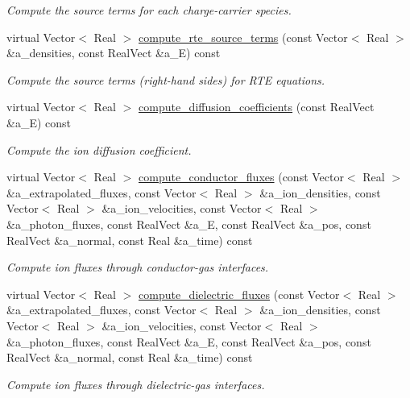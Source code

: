 \begin{DoxyCompactItemize}
\begin{DoxyCompactList}\small\item\em Compute the source terms for each charge-\/carrier species. \end{DoxyCompactList}\item 
virtual Vector$<$ Real $>$ \hyperlink{classmorrow__lowke_a6748c878d9069ec28cb1e22f4e75d7a0}{compute\+\_\+rte\+\_\+source\+\_\+terms} (const Vector$<$ Real $>$ \&a\+\_\+densities, const Real\+Vect \&a\+\_\+E) const 
\begin{DoxyCompactList}\small\item\em Compute the source terms (right-\/hand sides) for R\+TE equations. \end{DoxyCompactList}\item 
virtual Vector$<$ Real $>$ \hyperlink{classmorrow__lowke_a4c1779b91b8a7178c0fed5461e5caffa}{compute\+\_\+diffusion\+\_\+coefficients} (const Real\+Vect \&a\+\_\+E) const 
\begin{DoxyCompactList}\small\item\em Compute the ion diffusion coefficient. \end{DoxyCompactList}\item 
virtual Vector$<$ Real $>$ \hyperlink{classmorrow__lowke_a4f10a4423927838ff78d56c5404edd60}{compute\+\_\+conductor\+\_\+fluxes} (const Vector$<$ Real $>$ \&a\+\_\+extrapolated\+\_\+fluxes, const Vector$<$ Real $>$ \&a\+\_\+ion\+\_\+densities, const Vector$<$ Real $>$ \&a\+\_\+ion\+\_\+velocities, const Vector$<$ Real $>$ \&a\+\_\+photon\+\_\+fluxes, const Real\+Vect \&a\+\_\+E, const Real\+Vect \&a\+\_\+pos, const Real\+Vect \&a\+\_\+normal, const Real \&a\+\_\+time) const 
\begin{DoxyCompactList}\small\item\em Compute ion fluxes through conductor-\/gas interfaces. \end{DoxyCompactList}\item 
virtual Vector$<$ Real $>$ \hyperlink{classmorrow__lowke_a82ffc37f517efc6e866acd8c1a46a3ca}{compute\+\_\+dielectric\+\_\+fluxes} (const Vector$<$ Real $>$ \&a\+\_\+extrapolated\+\_\+fluxes, const Vector$<$ Real $>$ \&a\+\_\+ion\+\_\+densities, const Vector$<$ Real $>$ \&a\+\_\+ion\+\_\+velocities, const Vector$<$ Real $>$ \&a\+\_\+photon\+\_\+fluxes, const Real\+Vect \&a\+\_\+E, const Real\+Vect \&a\+\_\+pos, const Real\+Vect \&a\+\_\+normal, const Real \&a\+\_\+time) const 
\begin{DoxyCompactList}\small\item\em Compute ion fluxes through dielectric-\/gas interfaces. \end{DoxyCompactList}\item 

\end{DoxyCompactItemize}
